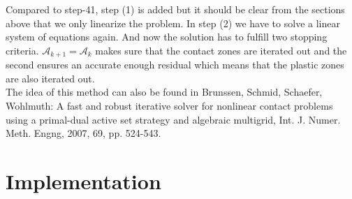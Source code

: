 \documentclass{article}
\begin{document}
Compared to step-41, step (1) is added but it should be clear
from the sections above that we only linearize the problem. In step (2) we have to solve a linear
system of equations again. And now the solution has to fulfill two stopping
criteria. $\mathcal{A}_{k+1} = \mathcal{A}_k$ makes sure that the contact zones are iterated out and the second ensures an accurate enough residual which means
that the plastic zones are also iterated out.\\
The idea of this method can also be found in Brunssen, Schmid, Schaefer,
Wohlmuth: A fast and robust iterative solver for nonlinear contact problems
using a primal-dual active set strategy and algebraic multigrid, Int. J. Numer.
Meth. Engng, 2007, 69, pp. 524-543.

\section{Implementation}
\end{document}

